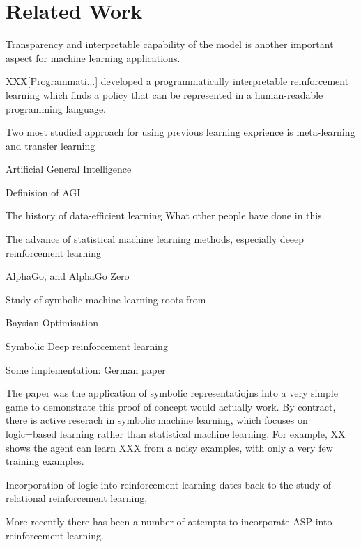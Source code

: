 \documentclass[12pt,twoside]{report}
\begin{document}
\chapter{Related Work}


Transparency and interpretable capability of the model is another important aspect for machine learning applications.


XXX[Programmati...] developed a programmatically interpretable reinforcement learning which finds a policy that can be represented in a human-readable programming language.

Two most studied approach for using previous learning exprience is meta-learning and transfer learning

Artificial General Intelligence

Definision of AGI

The history of data-efficient learning
What other people have done in this.

The advance of statistical machine learning methods, especially deeep reinforcement learning

AlphaGo, and AlphaGo Zero

Study of symbolic machine learning roots from

Baysian Optimisation

Symbolic Deep reinforcement learning

Some implementation: German paper

The paper was the application of symbolic representatiojns into a very simple game to demonstrate this proof of concept would actually work.
By contract, there is active reserach in symbolic machine learning, which focuses on logic=based learning rather than statistical machine learning.
For example, XX shows the agent can learn XXX from a noisy examples, with only a very few training examples.


Incorporation of logic into reinforcement learning dates back to the study of relational reinforcement learning,


More recently there has been a number of attempts to incorporate ASP into reinforcement learning.
\end{document}
